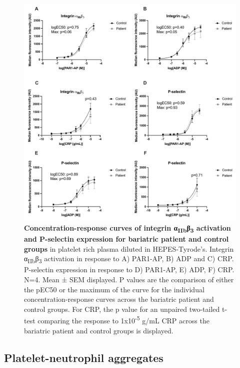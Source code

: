 \documentclass[11pt,twoside]{bristolthesis}
\begin{document}
\begin{figure}

{\centering \includegraphics[width=0.9\linewidth]{figure/Bariatric_study/Agonist_Integrin_Pselectin} 

}

\caption[Concentration-response curves of integrin α\textsubscript{IIb}β\textsubscript{3} activation and P-selectin expression for bariatric patient and control groups]{\textbf{Concentration-response curves of integrin α\textsubscript{IIb}β\textsubscript{3} activation and P-selectin expression for bariatric patient and control groups} in platelet rich plasma diluted in HEPES-Tyrode's. Integrin α\textsubscript{IIb}β\textsubscript{3} activation in response to A) PAR1-AP, B) ADP and C) CRP. P-selectin expression in response to D) PAR1-AP, E) ADP, F) CRP. N=4. Mean ± SEM displayed. P values are the comparison of either the pEC50 or the maximum of the curve for the individual concentration-response curves across the bariatric patient and control groups. For CRP, the p value for an unpaired two-tailed t-test comparing the response to 1x10\textsuperscript{-5} g/mL CRP across the bariatric patient and control groups is displayed.}\label{fig:agonist-integrin-pselectin}
\end{figure}
\hypertarget{platelet-neutrophil-aggregates}{%
\subsection{Platelet-neutrophil aggregates}\label{platelet-neutrophil-aggregates}}
\end{document}
